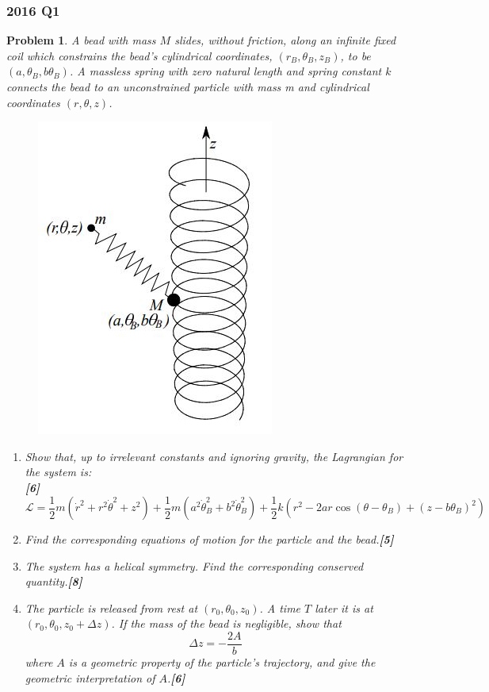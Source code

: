 \documentclass[a4paper]{article}
\theoremstyle{new}
\newtheorem{qns}{Problem}[section]
\begin{document}
\subsubsection*{2016 Q1}
\begin{qns}
A bead with mass $M$ slides, without friction, along an infinite fixed coil which constrains the bead’s cylindrical coordinates, $(r_B, \theta_B, z_B)$, to be $(a, \theta_B, b\theta_B)$. A massless spring with zero natural length and spring constant $k$ connects the bead to an unconstrained particle with mass m and cylindrical coordinates $(r, \theta, z)$. 
\begin{figure}[H]
    \centering
    \includegraphics[scale=0.5]{2016TP1Q1.JPG}
\end{figure}
\begin{enumerate}[label=(\alph*)]
\item Show that, up to irrelevant constants and ignoring gravity, the Lagrangian for the system is:\\ 

\hfill\textbf{[6]}
$$\mathcal{L}=\frac{1}{2}m(\dot{r}^2+r^2\dot{\theta}^2+z^2)+\frac{1}{2}m(a^2\dot{\theta}_B^2+b^2\dot{\theta}_B^2)+\frac{1}{2}k(r^2-2ar\cos(\theta-\theta_B)+(z-b\theta_B)^2)$$
\item Find the corresponding equations of motion for the particle and the bead.\hfill\textbf{[5]}
\item The system has a helical symmetry. Find the corresponding conserved quantity.\hfill\textbf{[8]}
\item The particle is released from rest at $(r_0, \theta_0, z_0)$. A time $T$ later it is at $(r_0, \theta_0, z_0 + \Delta z)$. If the mass of the bead is negligible, show that
$$\Delta z=-\frac{2A}{b}$$
where $A$ is a geometric property of the particle’s trajectory, and give the geometric interpretation of $A$.\hfill\textbf{[6]}
\end{enumerate}
\end{qns}
\end{document}
